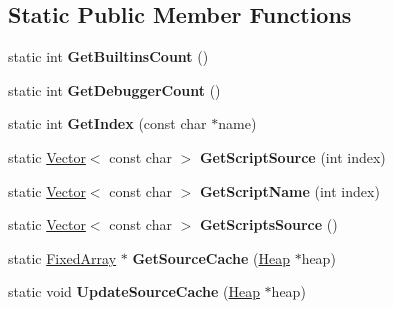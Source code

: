 \subsection*{Static Public Member Functions}
\begin{DoxyCompactItemize}
\item 
static int {\bfseries Get\+Builtins\+Count} ()\hypertarget{classv8_1_1internal_1_1_natives_collection_a81e3ac733b0a8f5e56af13b29b41e1cc}{}\label{classv8_1_1internal_1_1_natives_collection_a81e3ac733b0a8f5e56af13b29b41e1cc}

\item 
static int {\bfseries Get\+Debugger\+Count} ()\hypertarget{classv8_1_1internal_1_1_natives_collection_a2229a9268e522796a620c45d2fb16d48}{}\label{classv8_1_1internal_1_1_natives_collection_a2229a9268e522796a620c45d2fb16d48}

\item 
static int {\bfseries Get\+Index} (const char $\ast$name)\hypertarget{classv8_1_1internal_1_1_natives_collection_a7a8276ff535fb90fef0571092dbf56e1}{}\label{classv8_1_1internal_1_1_natives_collection_a7a8276ff535fb90fef0571092dbf56e1}

\item 
static \hyperlink{classv8_1_1internal_1_1_vector}{Vector}$<$ const char $>$ {\bfseries Get\+Script\+Source} (int index)\hypertarget{classv8_1_1internal_1_1_natives_collection_a0bf9320566066a3b5a64b42908409af4}{}\label{classv8_1_1internal_1_1_natives_collection_a0bf9320566066a3b5a64b42908409af4}

\item 
static \hyperlink{classv8_1_1internal_1_1_vector}{Vector}$<$ const char $>$ {\bfseries Get\+Script\+Name} (int index)\hypertarget{classv8_1_1internal_1_1_natives_collection_a5221c579647964d5872e507401f114a5}{}\label{classv8_1_1internal_1_1_natives_collection_a5221c579647964d5872e507401f114a5}

\item 
static \hyperlink{classv8_1_1internal_1_1_vector}{Vector}$<$ const char $>$ {\bfseries Get\+Scripts\+Source} ()\hypertarget{classv8_1_1internal_1_1_natives_collection_aaee8d7f1d766a04724e785123c8b6254}{}\label{classv8_1_1internal_1_1_natives_collection_aaee8d7f1d766a04724e785123c8b6254}

\item 
static \hyperlink{classv8_1_1internal_1_1_fixed_array}{Fixed\+Array} $\ast$ {\bfseries Get\+Source\+Cache} (\hyperlink{classv8_1_1internal_1_1_heap}{Heap} $\ast$heap)\hypertarget{classv8_1_1internal_1_1_natives_collection_a20488c95fd60d36b53a4546b52ada9f8}{}\label{classv8_1_1internal_1_1_natives_collection_a20488c95fd60d36b53a4546b52ada9f8}

\item 
static void {\bfseries Update\+Source\+Cache} (\hyperlink{classv8_1_1internal_1_1_heap}{Heap} $\ast$heap)\hypertarget{classv8_1_1internal_1_1_natives_collection_a0963bab124f7ee7f20212da311db4d0c}{}\label{classv8_1_1internal_1_1_natives_collection_a0963bab124f7ee7f20212da311db4d0c}

\end{DoxyCompactItemize}



